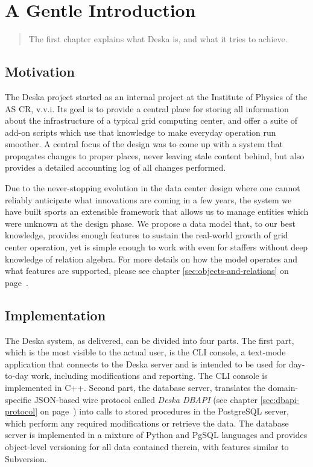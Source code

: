 \documentclass[deska]{subfiles}
\begin{document}
\chapter{A Gentle Introduction}

\begin{abstract}
The first chapter explains what Deska is, and what it tries to achieve.
\end{abstract}

\section{Motivation}

The Deska project started as an internal project at the Institute of Physics of the AS CR, v.v.i.  Its goal is to
provide a central place for storing all information about the infrastructure of a typical grid computing center, and
offer a suite of add-on scripts which use that knowledge to make everyday operation run smoother.  A central focus of
the design was to come up with a system that propagates changes to proper places, never leaving stale content behind,
but also provides a detailed accounting log of all changes performed.

Due to the never-stopping evolution in the data center design where one cannot reliably anticipate what innovations are
coming in a few years, the system we have built sports an extensible framework that allows us to manage entities which
were unknown at the design phase.  We propose a data model that, to our best knowledge, provides enough features to
sustain the real-world growth of grid center operation, yet is simple enough to work with even for staffers without deep
knowledge of relation algebra.  For more details on how the model operates and what features are supported, please see
chapter \ref{sec:objects-and-relations} on page~\pageref{sec:objects-and-relations}.

\section{Implementation}

The Deska system, as delivered, can be divided into four parts.  The first part, which is the most visible to the actual
user, is the CLI console, a text-mode application that connects to the Deska server and is intended to be used for
day-to-day work, including modifications and reporting.  The CLI console is implemented in C++.  Second part, the
database server, translates the domain-specific JSON-based wire protocol called {\em Deska DBAPI} (see chapter
\ref{sec:dbapi-protocol} on page~\pageref{sec:dbapi-protocol}) into calls to stored procedures in the PostgreSQL server,
which perform any required modifications or retrieve the data.  The database server is implemented in a mixture of
Python and PgSQL languages and provides object-level versioning for all data contained therein, with features similar to
Subversion.
\end{document}
